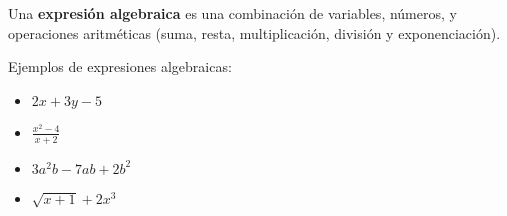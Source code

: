 


\begin{definition}
Una \textbf{expresión algebraica} es una combinación de variables, números, y operaciones aritméticas (suma, resta, multiplicación, división y exponenciación).
\end{definition}

\begin{example}
Ejemplos de expresiones algebraicas:
\begin{itemize}
\item $2x + 3y - 5$
\item $\frac{x^2 - 4}{x + 2}$
\item $3a^2b - 7ab + 2b^2$
\item $\sqrt{x + 1} + 2x^3$
\end{itemize}
\end{example}


